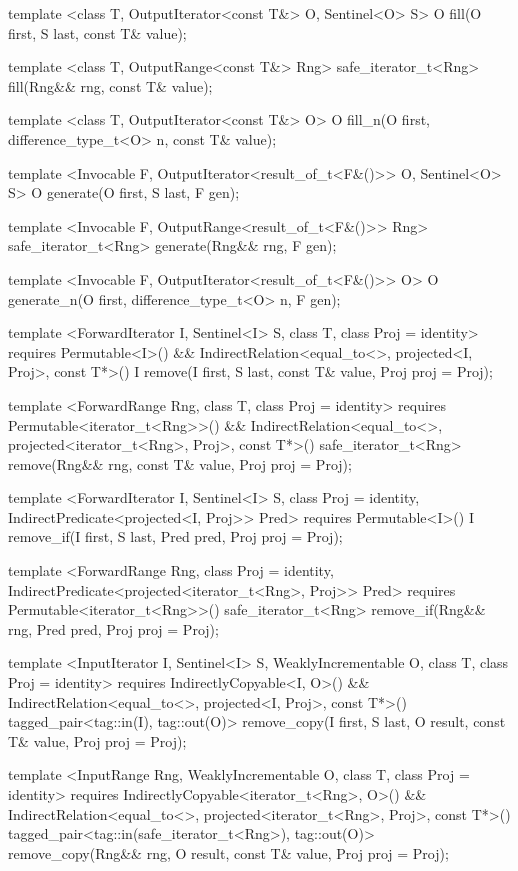 \begin{codeblock}
{{{{  template <class T, OutputIterator<const T&> O, Sentinel<O> S>
    O fill(O first, S last, const T& value);

  template <class T, OutputRange<const T&> Rng>
    safe_iterator_t<Rng>
      fill(Rng&& rng, const T& value);

  template <class T, OutputIterator<const T&> O>
    O fill_n(O first, difference_type_t<O> n, const T& value);

  template <Invocable F, OutputIterator<result_of_t<F&()>> O,
      Sentinel<O> S>
    O generate(O first, S last, F gen);

  template <Invocable F, OutputRange<result_of_t<F&()>> Rng>
    safe_iterator_t<Rng>
      generate(Rng&& rng, F gen);

  template <Invocable F, OutputIterator<result_of_t<F&()>> O>
    O generate_n(O first, difference_type_t<O> n, F gen);

  template <ForwardIterator I, Sentinel<I> S, class T, class Proj = identity>
    requires Permutable<I>() &&
      IndirectRelation<equal_to<>, projected<I, Proj>, const T*>()
    I remove(I first, S last, const T& value, Proj proj = Proj{});

  template <ForwardRange Rng, class T, class Proj = identity>
    requires Permutable<iterator_t<Rng>>() &&
      IndirectRelation<equal_to<>, projected<iterator_t<Rng>, Proj>, const T*>()
    safe_iterator_t<Rng>
      remove(Rng&& rng, const T& value, Proj proj = Proj{});

  template <ForwardIterator I, Sentinel<I> S, class Proj = identity,
      IndirectPredicate<projected<I, Proj>> Pred>
    requires Permutable<I>()
    I remove_if(I first, S last, Pred pred, Proj proj = Proj{});

  template <ForwardRange Rng, class Proj = identity,
      IndirectPredicate<projected<iterator_t<Rng>, Proj>> Pred>
    requires Permutable<iterator_t<Rng>>()
    safe_iterator_t<Rng>
      remove_if(Rng&& rng, Pred pred, Proj proj = Proj{});

  template <InputIterator I, Sentinel<I> S, WeaklyIncrementable O, class T,
      class Proj = identity>
    requires IndirectlyCopyable<I, O>() &&
      IndirectRelation<equal_to<>, projected<I, Proj>, const T*>()
    tagged_pair<tag::in(I), tag::out(O)>
      remove_copy(I first, S last, O result, const T& value, Proj proj = Proj{});

  template <InputRange Rng, WeaklyIncrementable O, class T, class Proj = identity>
    requires IndirectlyCopyable<iterator_t<Rng>, O>() &&
      IndirectRelation<equal_to<>, projected<iterator_t<Rng>, Proj>, const T*>()
    tagged_pair<tag::in(safe_iterator_t<Rng>), tag::out(O)>
      remove_copy(Rng&& rng, O result, const T& value, Proj proj = Proj{});

}}}}
\end{codeblock}
